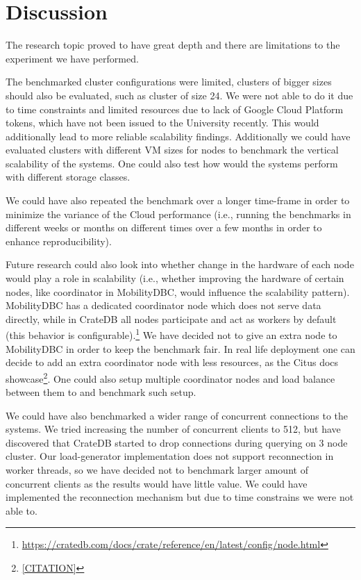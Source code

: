 \section{Discussion}
\label{cha:discussion}

The research topic proved to have great depth and there are limitations to the experiment we have performed.

The benchmarked cluster configurations were limited, clusters of bigger sizes should also be evaluated, such as cluster of size 24.
We were not able to do it due to time constraints and limited resources due to lack of Google Cloud Platform tokens, which have not been issued to the University recently.
This would additionally lead to more reliable scalability findings.
Additionally we could have evaluated clusters with different VM sizes for nodes to benchmark the vertical scalability of the systems.
One could also test how would the systems perform with different storage classes.

We could have also repeated the benchmark over a longer time-frame in order to minimize the variance of the Cloud performance
(i.e., running the benchmarks in different weeks or months on different times over a few months in order to enhance reproducibility).

Future research could also look into whether change in the hardware of each node would play a role in scalability 
(i.e., whether improving the hardware of certain nodes, like coordinator in MobilityDBC, would influence the scalability pattern).
MobilityDBC has a dedicated coordinator node which does not serve data directly, while in CrateDB all nodes participate and act as workers by default (this behavior is configurable).\footnote{\url{https://cratedb.com/docs/crate/reference/en/latest/config/node.html}}
We have decided not to give an extra node to MobilityDBC in order to keep the benchmark fair.
In real life deployment one can decide to add an extra coordinator node with less resources, as the Citus docs showcase\footnote{\url{[CITATION]}}.
One could also setup multiple coordinator nodes and load balance between them to and benchmark such setup.

We could have also benchmarked a wider range of concurrent connections to the systems.
We tried increasing the number of concurrent clients to 512, but have discovered that CrateDB started to drop connections during querying on 3 node cluster.
Our load-generator implementation does not support reconnection in worker threads, so we have decided not to benchmark larger amount of concurrent clients as the results would have little value.
We could have implemented the reconnection mechanism but due to time constrains we were not able to.

